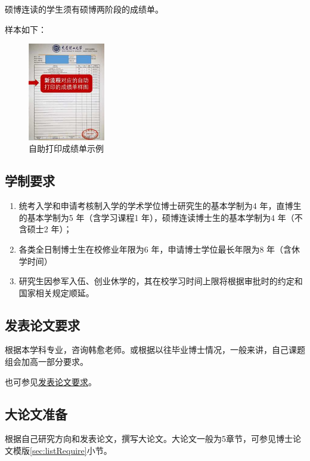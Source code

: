 \documentclass[12pt,a4paper]{ctexart}
\begin{document}
硕博连读的学生须有硕博两阶段的成绩单。

样本如下：

\begin{figure}[H]
  \centering
  \includegraphics[width=0.3\textwidth]{images/meritList.jpg}  %
  \caption{自助打印成绩单示例}
\end{figure}

\subsection{学制要求}
\label{sec:yearRequire}

\begin{enumerate}
\item 统考入学和申请考核制入学的学术学位博士研究生的基本学制为4 年，直博生的基本学制为5 年（含学习课程1 年），硕博连读博士生的基本学制为4 年（不含硕士2 年）；
\item 各类全日制博士生在校修业年限为6 年，申请博士学位最长年限为8 年（含休学时间）
\item 研究生因参军入伍、创业休学的，其在校学习时间上限将根据审批时的约定和国家相关规定顺延。
\end{enumerate}


\subsection{发表论文要求}
\label{sec:paperRequire}

根据本学科专业，咨询韩愈老师。或根据以往毕业博士情况，一般来讲，自己课题组会加高一部分要求。

也可参见\href{https://gs.dlut.edu.cn/yjspy/xwgl12/fblwyq1.htm}{发表论文要求}。

\subsection{大论文准备}
\label{sec:thesisRequire}

根据自己研究方向和发表论文，撰写大论文。大论文一般为5章节，可参见博士论文模版\ref{sec:listRequire}小节。
\end{document}
